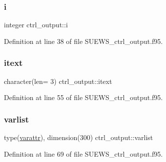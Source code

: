 \subsubsection{\texorpdfstring{i}{i}}
{\footnotesize\ttfamily integer ctrl\+\_\+output\+::i}



Definition at line 38 of file S\+U\+E\+W\+S\+\_\+ctrl\+\_\+output.\+f95.

\mbox{\label{namespacectrl__output_a4c25bfab41d6433c78b76c0a0d9c03b8}} 
\subsubsection{\texorpdfstring{itext}{itext}}
{\footnotesize\ttfamily character(len= 3) ctrl\+\_\+output\+::itext}



Definition at line 55 of file S\+U\+E\+W\+S\+\_\+ctrl\+\_\+output.\+f95.

\mbox{\label{namespacectrl__output_abf54926f3da30aea81f0d2ddfc9f4649}} 
\subsubsection{\texorpdfstring{varlist}{varlist}}
{\footnotesize\ttfamily type(\hyperlink{structctrl__output_1_1varattr}{varattr}), dimension(300) ctrl\+\_\+output\+::varlist}



Definition at line 69 of file S\+U\+E\+W\+S\+\_\+ctrl\+\_\+output.\+f95.

